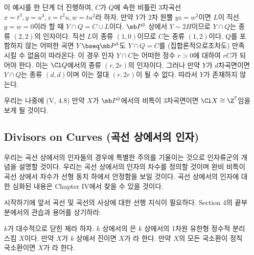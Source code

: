 	
	\begin{example}
	이 예시를 한 단계 더 진행하여, $C$가 $Q$에 속한 비틀린 3차곡선 $x=t^3,y=u^3,z=t^2u,w=tu^2$라 하자.
	만약 $Y$가 2차 원뿔 $yz=w^2$이면 $L$이 직선 $y=w=0$이라 할 때 $Y\cap Q=C\cup L$이다.
	$\mb P^3$ 상에서 $Y\sim 2H$이므로 $Y\cap Q$는 종류 $(2,2)$의 인자이다.
	직선 $L$이 종류 $(1,0)$이므로 $C$는 종류 $(1,2)$이다.
	$Q$를 포함하지 않는 어떠한 곡면 $Y\bseq\mb P^3$도 $Y\cap Q=C$를 (집합론적으로조차도) 만족시킬 수 없음이 따라온다:
	이 경우 인자 $Y\cap C$는 어떠한 정수 $r>0$에 대하여 $rC$가 되어야 한다.
	이는 $\Cl Q$에서의 종류 $(r,2r)$의 인자이다.
	그러나 만약 $Y$가 $d$차곡면이면 $Y\cap Q$는 종류 $(d,d)$이며 이는 절대 $(r,2r)$이 될 수 없다. 따라서 $Y$가 존재하지 않는다.
	\end{example}
	
	
	\begin{example}
	우리는 나중에 (V, 4.8) 만약 $X$가 $\mb P^3$에서의 비특이 3차곡면이면 $\Cl X\cong\Z^7$임을 보게 될 것이다.
	\end{example}
	
	
	
	\subsection*{Divisors on Curves (곡선 상에서의 인자)}
	
	우리는 곡선 상에서의 인자들의 경우에 특별한 주의를 기울이는 것으로 인자류군의 개념을 설명할 것이다.
	우리는 곡선 상에서의 인자의 차수를 정의할 것이며 완비 비특이 곡선 상에서 차수가 선형 동치 하에서 안정함을 보일 것이다.
	곡선 상에서의 인자에 대한 심화된 내용은 Chapter IV에서 찾을 수 있을 것이다.
	
	시작하기에 앞서 곡선 및 곡선의 사상에 대한 선행 지식이 필요하다.
	Section 4의 끝부분에서의 관습과 용어를 상기하라:
	
	
	\begin{definition}
	$k$가 대수적으로 닫힌 체라 하자. $k$ 상에서의 은 $k$ 상에서의 1차원 유한형 정수적 분리 스킴 $X$이다.
	만약 $X$가 $k$ 상에서 진이면 $X$가 라 한다.
	만약 $X$의 모든 국소환이 정칙 국소환이면 $X$가 라 한다.
	\end{definition}
	
